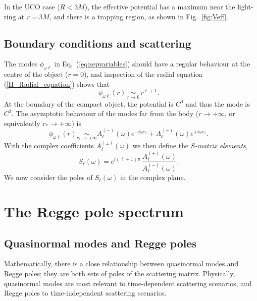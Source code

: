 \documentclass[aps,prd,longbibliography,reprint,twocolumn,amsmath,amssymb,amsfonts,showpacs,footnote,superscriptaddress]{revtex4-1}%
\begin{document}
In the UCO case ($R < 3M$), the effective potential has a maximum near the light-ring at $r=3M$, and there is a trapping region, as shown in Fig.~\ref{fig:Veff}.

\subsection{Boundary conditions and scattering}\label{subsec:bc}
The modes $\phi_{\omega \ell}$ in Eq.~(\ref{eq:sepvariables}) should have a regular behaviour at the centre of the object ($r = 0$), and inspection of the radial equation (\ref{H_Radial_equation}) shows that
\begin{equation}\label{bc_1_in}
\phi_{\omega  \ell}(r) \, \scriptstyle{\underset{r \to 0}{\sim}} \,
\displaystyle{r^{\ell+1}}.
\end{equation}
At the boundary of the compact object, the potential is $C^0$ and thus the mode is $C^2$.
The asymptotic behaviour of the modes far from the body ($r \to +\infty$, or equivalently $r_\ast \to +\infty$) is
\begin{equation}\label{bc_2_in}
\phi_{\omega  \ell}(r) \scriptstyle{\underset{r_\ast \to +\infty}{\sim}}
\displaystyle{ A^{(-)}_\ell (\omega) e^{-i\omega r_\ast} + A^{(+)}_\ell (\omega) e^{+i\omega r_\ast}}.
\end{equation}
With the complex coefficients $A^{(\pm)}_\ell (\omega)$ we then define the \emph{$S$-matrix elements},
\begin{equation}\label{Matrix_S}
  S_{\ell}(\omega) =  e^{i(\ell+1)\pi} \, \frac{A_{\ell}^{(+)}(\omega)}{A_{\ell}^{(-)}(\omega)}.
\end{equation}
We now consider the poles of $S_{\ell}(\omega)$ in the complex plane.


\section{The Regge pole spectrum}\label{sec:RP}

 \subsection{Quasinormal modes and Regge poles}\label{subsec:QNMs_RPs}
 Mathematically, there is a close relationship between quasinormal modes and Regge poles; they are both sets of poles of the scattering matrix. Physically, quasinormal modes are most relevant to time-dependent scattering scenarios, and Regge poles to time-independent scattering scenarios.
\end{document}
